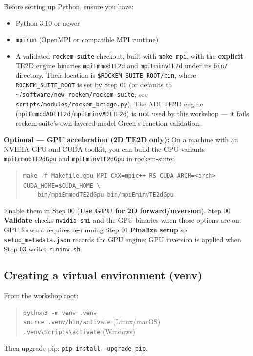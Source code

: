 \documentclass[11pt,a4paper]{article}
\begin{document}
Before setting up Python, ensure you have:
\begin{itemize}
  \item Python 3.10 or newer
  \item \texttt{mpirun} (OpenMPI or compatible MPI runtime)
  \item A validated \texttt{rockem-suite} checkout, built with \texttt{make mpi}, with the \textbf{explicit} TE2D engine binaries \texttt{mpiEmmodTE2d} and \texttt{mpiEminvTE2d} under its \texttt{bin/} directory. Their location is \texttt{\$ROCKEM\_SUITE\_ROOT/bin}, where \texttt{ROCKEM\_SUITE\_ROOT} is set by Step 00 (or defaults to \texttt{\textasciitilde/software/new\_rockem/rockem-suite}; see \texttt{scripts/modules/rockem\_bridge.py}). The ADI TE2D engine (\texttt{mpiEmmodADITE2d}/\texttt{mpiEminvADITE2d}) is \textbf{not} used by this workshop — it fails rockem-suite's own layered-model Green's-function validation.
\end{itemize}

\textbf{Optional — GPU acceleration (2D TE2D only):} On a machine with an NVIDIA GPU and CUDA toolkit, you can build the GPU variants \texttt{mpiEmmodTE2dGpu} and \texttt{mpiEminvTE2dGpu} in rockem-suite:
\begin{quote}
  \texttt{make -f Makefile.gpu MPI\_CXX=mpic++ RS\_CUDA\_ARCH=<arch> CUDA\_HOME=\$CUDA\_HOME \textbackslash}\\
  \texttt{\ \ \ \ bin/mpiEmmodTE2dGpu bin/mpiEminvTE2dGpu}
\end{quote}
Enable them in Step 00 (\textbf{Use GPU for 2D forward/inversion}). Step 00 \textbf{Validate} checks \texttt{nvidia-smi} and the GPU binaries when those options are on. GPU forward requires re-running Step 01 \textbf{Finalize setup} so \texttt{setup\_metadata.json} records the GPU engine; GPU inversion is applied when Step 03 writes \texttt{runinv.sh}.

\subsection{Creating a virtual environment (venv)}

From the workshop root:
\begin{quote}
  \texttt{python3 -m venv .venv}\\
  \texttt{source .venv/bin/activate} \quad (Linux/macOS)\\
  \texttt{.venv\textbackslash Scripts\textbackslash activate} \quad (Windows)
\end{quote}
Then upgrade pip: \texttt{pip install --upgrade pip}.
\end{document}
